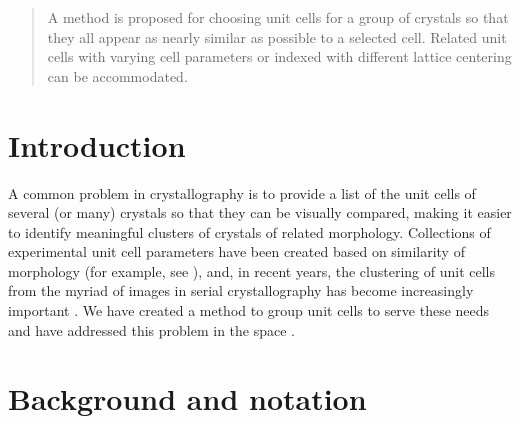 \documentclass[preprint]{iucr}              %
\numberwithin{equation}{section}
\numberwithin{equation}{section}
\begin{document}
	\begin{abstract}
		
		A method is proposed for choosing unit cells for a group of crystals so that they all appear
		as nearly similar as possible to a selected cell. Related unit cells with varying cell parameters 
		or indexed with different lattice centering can be accommodated.
		
	
		
	\end{abstract}
	
	
	
	
	
	
	
	\section{Introduction}
	
	A common problem in crystallography is to provide a list of the unit cells of several (or many) 
	crystals so that they can be visually compared, making it easier to identify meaningful clusters
	of crystals of related morphology. Collections of experimental unit cell parameters have 
	been created based on similarity of morphology (for example, see ), and,
	in recent years, the clustering of unit cells from the
	myriad of images in serial crystallography has become increasingly important \cite{keable2021room}. We have created a method
	to group unit cells to serve these needs and have addressed this problem in the space \SVI{} \cite{Andrews2019b}.
	
	\section{Background and notation}
	
\end{document}
